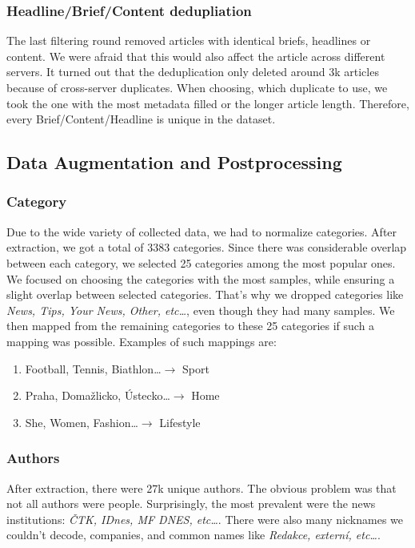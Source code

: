 \subsubsection{Headline/Brief/Content dedupliation}
The last filtering round removed articles with identical briefs, headlines or content.
We were afraid that this would also affect the article across different servers.
It turned out that the deduplication only deleted around 3k articles
because of cross-server duplicates.
When choosing, which duplicate to use, we took the one with the most metadata filled
or the longer article length.
Therefore, every Brief/Content/Headline is unique in the dataset.

\subsection{Data Augmentation and Postprocessing}

\subsubsection{Category}
\label{sec:category}
Due to the wide variety of collected data, we had to normalize categories.
After extraction, we got a total of 3383 categories.
Since there was considerable overlap between each category,
we selected 25 categories among the most popular ones.
We focused on choosing the categories with the most samples,
while ensuring a slight overlap between selected categories.
That's why we dropped categories like \textit{News, Tips, Your News, Other, etc\dots},
even though they had many samples.
We then mapped from the remaining categories to these 25 categories if such a mapping was possible.
Examples of such mappings are:
\begin{enumerate}
    \item Football, Tennis, Biathlon\dots $\rightarrow$ Sport
    \item Praha, Domažlicko, Ústecko\dots $\rightarrow$ Home
    \item She, Women, Fashion\dots $\rightarrow$ Lifestyle
\end{enumerate}

\subsubsection{Authors}
\label{sec:authors}
After extraction, there were 27k unique authors.
The obvious problem was that not all authors were people.
Surprisingly, the most prevalent were the news institutions: \textit{ČTK, IDnes, MF DNES, etc\dots}.
There were also many nicknames we couldn't decode, companies,
and common names like \textit{Redakce, externí, etc\dots}.

